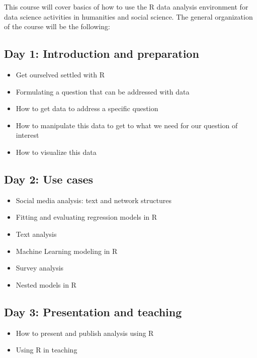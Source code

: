 \documentclass[12pt,]{book}
\providecommand{\tightlist}{%
  \setlength{\itemsep}{0pt}\setlength{\parskip}{0pt}}
\theoremstyle{definition}
\theoremstyle{definition}
\theoremstyle{remark}
\begin{document}
This course will cover basics of how to use the R data analysis
environment for data science activities in humanities and social
science. The general organization of the course will be the following:

\subsection{Day 1: Introduction and
preparation}\label{day-1-introduction-and-preparation}

\begin{itemize}
\tightlist
\item
  Get ourselved settled with R
\item
  Formulating a question that can be addressed with data
\item
  How to get data to address a specific question
\item
  How to manipulate this data to get to what we need for our question of
  interest
\item
  How to visualize this data
\end{itemize}

\subsection{Day 2: Use cases}\label{day-2-use-cases}

\begin{itemize}
\tightlist
\item
  Social media analysis: text and network structures
\item
  Fitting and evaluating regression models in R
\item
  Text analysis
\item
  Machine Learning modeling in R
\item
  Survey analysis
\item
  Nested models in R
\end{itemize}

\subsection{Day 3: Presentation and
teaching}\label{day-3-presentation-and-teaching}

\begin{itemize}
\tightlist
\item
  How to present and publish analysis using R
\item
  Using R in teaching
\end{itemize}
\end{document}
